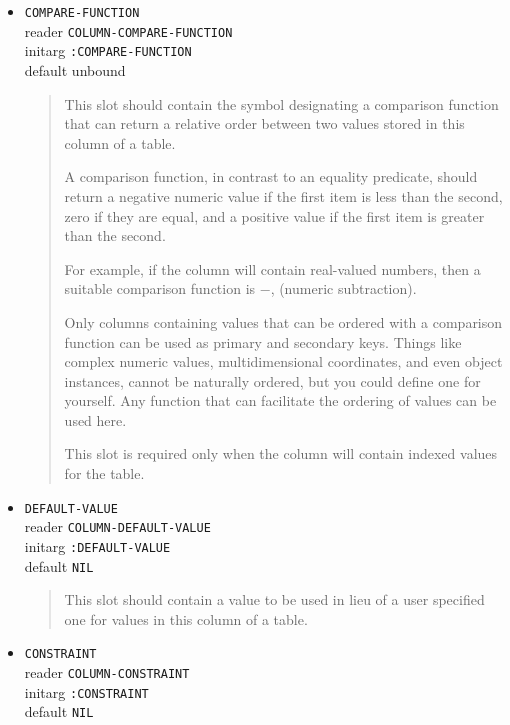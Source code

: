 \documentclass[article,oneside]{memoir}
\begin{document}
\begin{itemize}
\item \texttt{COMPARE-FUNCTION} \\ 
reader \texttt{COLUMN-COMPARE-FUNCTION} \\ 
initarg \texttt{:COMPARE-FUNCTION} \\ 
default unbound

\begin{quote}
 This slot should contain the symbol designating a comparison function that can return a relative order between two values stored in this column of a table. 

A comparison function, in contrast to an equality predicate, should return a negative numeric value if the first item is less than the second, zero if they are equal, and a positive value if the first item is greater than the second. 

For example, if the column will contain real-valued numbers, then a suitable comparison function is $-$, (numeric subtraction).

Only columns containing values that can be ordered with a comparison function can be used as primary and secondary keys. Things like complex numeric values, multidimensional coordinates, and even object instances, cannot be naturally ordered, but you could define one for yourself. Any function that can facilitate the ordering of values can be used here.

This slot is required only when the column will contain indexed values for the table.
\end{quote}

\item \texttt{DEFAULT-VALUE} \\ 
reader \texttt{COLUMN-DEFAULT-VALUE} \\ 
initarg \texttt{:DEFAULT-VALUE} \\ 
default \texttt{NIL}

\begin{quote}
This slot should contain a value to be used in lieu of a user specified one for values in this column of a table.
\end{quote}

\item \texttt{CONSTRAINT} \\ 
reader \texttt{COLUMN-CONSTRAINT} \\ 
initarg \texttt{:CONSTRAINT} \\ 
default \texttt{NIL}


\end{itemize}
\end{document}
